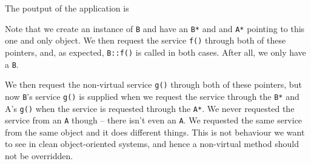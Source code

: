 \noindent{\small }

The poutput of the application is


Note that we create an instance of \verb+B+ and have an \verb+B*+ and and 
\verb+A*+ pointing to this one and only object. We then request the service 
\verb+f()+ through both of these pointers, and, as expected, \verb+B::f()+
is called in both cases. After all, we only have a \verb+B+.

We then request the non-virtual service \verb+g()+ through both of these 
pointers, but now \verb+B+'s service \verb+g()+ is supplied when we request
the service through the \verb+B*+ and A's \verb+g()+ when the service
is requested through the \verb+A*+. We never requested the service from
an \verb+A+ though -- there isn't even an \verb+A+. We requested the same
service from the same object and it does different things. This is not 
behaviour we want to see in clean object-oriented systems, and hence
a non-virtual method should not be overridden.